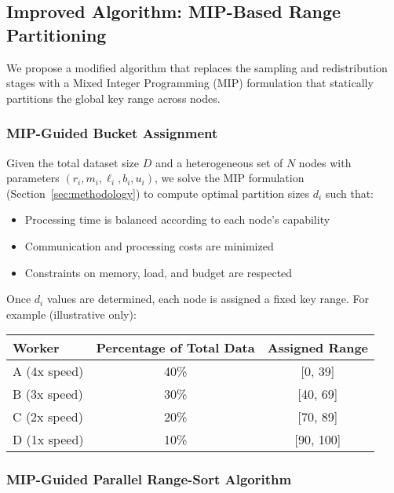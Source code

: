 \documentclass[]{interact}
\theoremstyle{plain}
\theoremstyle{definition}
\theoremstyle{remark}
\begin{document}
\vspace{1em}

\subsection{Improved Algorithm: MIP-Based Range Partitioning}

We propose a modified algorithm that replaces the sampling and redistribution stages with a Mixed Integer Programming (MIP) formulation that statically partitions the global key range across nodes.

\subsubsection{MIP-Guided Bucket Assignment}

Given the total dataset size $D$ and a heterogeneous set of $N$ nodes with parameters $(r_i, m_i, \ell_i, b_i, u_i)$, we solve the MIP formulation (Section~\ref{sec:methodology}) to compute optimal partition sizes $d_i$ such that:

\begin{itemize}
    \item Processing time is balanced according to each node's capability
    \item Communication and processing costs are minimized
    \item Constraints on memory, load, and budget are respected
\end{itemize}

Once $d_i$ values are determined, each node is assigned a fixed key range. For example (illustrative only):

\begin{center}
\begin{tabular}{l|c|c}
\textbf{Worker} & \textbf{Percentage of Total Data} & \textbf{Assigned Range} \\
\hline
A (4x speed) & 40\% & [0, 39] \\
B (3x speed) & 30\% & [40, 69] \\
C (2x speed) & 20\% & [70, 89] \\
D (1x speed) & 10\% & [90, 100] \\
\end{tabular}
\end{center}

\subsubsection{MIP-Guided Parallel Range-Sort Algorithm}
\end{document}
